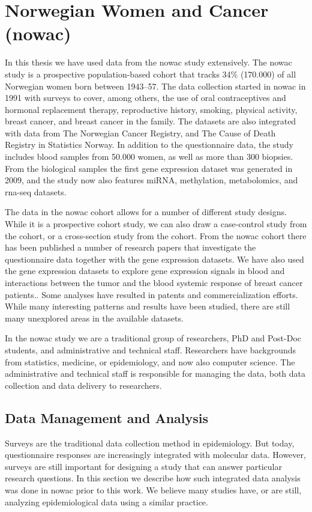 \section{Norwegian Women and Cancer (\gls{nowac})}
In this thesis we have used data from the \gls{nowac} study extensively. 
The \gls{nowac} study is a prospective population-based cohort that tracks 34\%
(170.000) of all Norwegian women born between 1943–57.\cite{nowac} The data
collection started in \gls{nowac} in 1991 with surveys to cover, among others,
the use of oral contraceptives and hormonal replacement therapy, reproductive
history, smoking, physical activity, breast cancer, and breast cancer in the
family. The datasets are also integrated with data from The Norwegian Cancer
Registry, and The Cause of Death Registry in Statistics Norway. In addition
to the questionnaire data, the study includes blood samples from 50.000 women,
as well as more than 300 biopsies. From the biological samples the first gene
expression dataset was generated in 2009, and the study now also features miRNA,
methylation, metabolomics, and \gls{rna}-seq datasets. 

The data in the \gls{nowac} cohort allows for a number of different study
designs. While it is a prospective cohort study, we can also draw a case-control
study from the cohort, or a cross-section study from the cohort. From the
\gls{nowac} cohort there has been published a number of research papers that
investigate the questionnaire data together with the gene expression
datasets.\cite{olsen2013plasma,dumeaux2010deciphering}  We have also used the
gene expression datasets to explore gene expression signals in blood and
interactions between the tumor and the blood systemic response of breast cancer
patients.\cite{holden2017local, dumeaux2017interactions}. Some analyses have
resulted in patents\cite{blobrec} and commercialization efforts.  While many
interesting patterns and results have been studied, there are still many
unexplored areas in the available datasets.

In the \gls{nowac} study we are a traditional group of researchers, PhD and
Post-Doc students, and administrative and technical staff. Researchers have
backgrounds from statistics, medicine, or epidemiology, and now also computer
science. The administrative and technical staff is responsible for managing the
data, both data collection and data delivery to researchers. 

\subsection{Data Management and Analysis} 
Surveys are the traditional data collection method in epidemiology. But
today, questionnaire responses are increasingly integrated with molecular data.
However, surveys are still important for designing a study that can answer
particular research questions.  In this section we describe how such integrated
data analysis was done in \gls{nowac} prior to this work. We
believe many studies have, or are still, analyzing epidemiological data using
a similar practice. 


